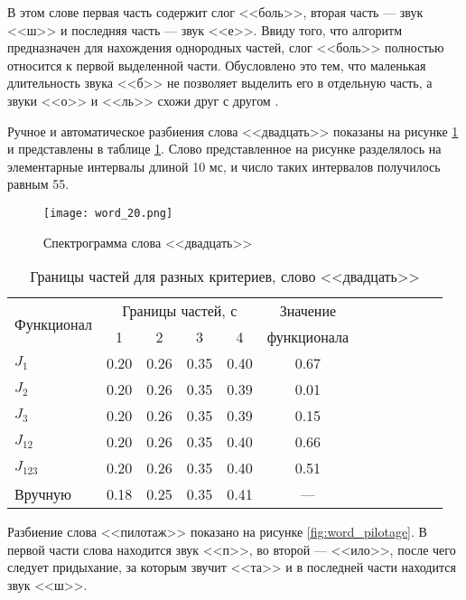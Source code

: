 В этом слове первая часть содержит слог <<боль>>, вторая часть --- звук <<ш>> и последняя часть --- звук <<е>>.
Ввиду того, что алгоритм предназначен для нахождения однородных частей, слог <<боль>> полностью относится к первой выделенной части.
Обусловлено это тем, что маленькая длительность звука <<б>> не позволяет выделить его в отдельную часть, а звуки <<о>> и <<ль>> схожи друг с другом \cite{cooper1952some, blumstein1980perceptual}.

Ручное и автоматическое разбиения слова <<двадцать>> показаны на рисунке \ref{fig:word_20} и представлены в таблице \ref{tab:results_20}.
Слово представленное на рисунке разделялось на элементарные интервалы длиной 10 мс, и число таких интервалов получилось равным 55.

\begin{figure}[h]
	\centering
	\texttt{[image: word\_20.png]}
	\caption{Спектрограмма слова <<двадцать>>}
	\label{fig:word_20}
\end{figure}

\begin{table}[h]
	\centering
	\caption{Границы частей для разных критериев, слово <<двадцать>>}
	\label{tab:results_20}
	{\normalsize
		\begin{tabular}{| l | c | c | c | c | c | c | c | c | c | c | c |}
			\hline
			\multirow{2}{*}{Функционал} & \multicolumn{4}{c|}{Границы частей, с} & Значение \\
			\hhline{~----~} & \phantom{000} 1 \phantom{000} & \phantom{000} 2 \phantom{000} & \phantom{000} 3 \phantom{000} & \phantom{000} 4 \phantom{000} & \phantom{00}функционала\phantom{00} \\
			\hline
			$J_{1}$		& 0.20 & 0.26 & 0.35 & 0.40 & 0.67 \\
			$J_{2}$		& 0.20 & 0.26 & 0.35 & 0.39 & 0.01 \\
			$J_{3}$		& 0.20 & 0.26 & 0.35 & 0.39 & 0.15 \\
			$J_{12}$	& 0.20 & 0.26 & 0.35 & 0.40 & 0.66 \\
			$J_{123}$	& 0.20 & 0.26 & 0.35 & 0.40 & 0.51 \\
			\hline
			Вручную		& 0.18 & 0.25 & 0.35 & 0.41 & --- \\
			\hline
		\end{tabular}
	}
\end{table}

Разбиение слова <<пилотаж>> показано на рисунке \ref{fig:word_pilotage}.
В первой части слова находится звук <<п>>, во второй --- <<ило>>, после чего следует придыхание, за которым звучит <<та>> и в последней части находится звук <<ш>>.

